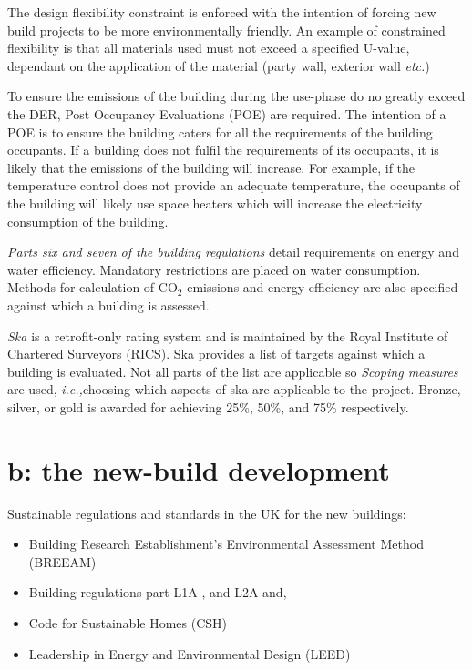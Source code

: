 \documentclass[a4paper,fleqn]{article}
\makeatletter
\newcommand{\ie}{\emph{i.e.,\@\xspace}}
\newcommand{\etc}{\emph{etc.\@\xspace}}
\let\stdsection\section
\renewcommand{\section}{\newpage\stdsection}
\renewcommand{\cite}{\citep}
\makeatother
\begin{document}
The design flexibility constraint is enforced with the intention of forcing new build projects to be more 
environmentally friendly. An example of constrained flexibility is that all materials used must 
not exceed a specified U-value, dependant on the application of the material (party wall, exterior wall 
\etc)

To ensure the emissions of the building during the use-phase do no greatly exceed the DER, Post Occupancy 
Evaluations (POE) are required. The intention of a POE is to ensure the building caters for all the requirements 
of the building occupants. If a building does not fulfil the requirements of its occupants, it is likely that 
the emissions of the building will increase. For example, if the temperature control does not provide an adequate 
temperature, the occupants of the building will likely use space heaters which will increase the electricity 
consumption of the building.

\emph{Parts six and seven of the building regulations} detail requirements on energy and water efficiency. Mandatory 
restrictions are placed on water consumption. Methods for calculation of CO$_2$ emissions and energy efficiency are 
also specified against which a building is assessed.

\emph{Ska} is a retrofit-only rating system and is maintained by the Royal Institute of Chartered Surveyors (RICS). 
Ska provides a list of targets against which a building is evaluated. Not all parts of the list are applicable so 
\emph{Scoping measures} are used, \ie choosing which aspects of ska are applicable to the project. Bronze, silver, 
or gold is awarded for achieving 25\%, 50\%, and 75\% respectively.


\section*{b: the new-build development}

Sustainable regulations and standards in the UK for the new buildings:
\begin{itemize}
	\item Building Research Establishment's Environmental Assessment Method (BREEAM) \cite{BRE2012}
	\item Building regulations part L1A \cite{Communities&LocalGovernment2010}, and  
		L2A \cite{Communities&LocalGovernment2010b} and, 
	\item Code for Sustainable Homes (CSH) \cite{Communities&LocalGovernment2010d}
	\item Leadership in Energy and Environmental Design (LEED)
\end{itemize}
\end{document}

